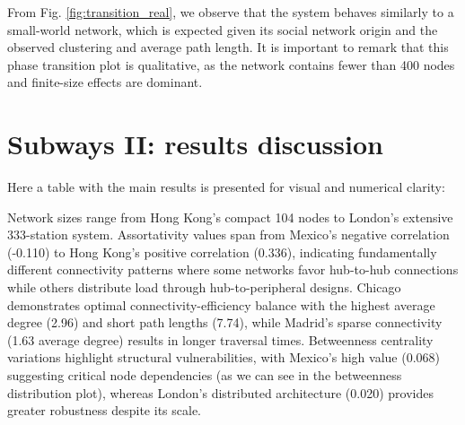 From Fig. \ref{fig:transition_real}, we observe that the system behaves similarly to a small-world network, which is expected given its social network origin and the observed clustering and average path length. It is important to remark that this phase transition plot is qualitative, as the network contains fewer than 400 nodes and finite-size effects are dominant.
\newpage
\section{Subways II: results discussion}
Here a table with the main results is presented for visual and numerical clarity:

\begin{table}[h!]
\centering
{}
\caption{Network statistics for the analyzed subway networks.}
\label{tab:network_stats}
\end{table}

Network sizes range from Hong Kong's compact 104 nodes to London's extensive 333-station system. Assortativity values span from Mexico's negative correlation (-0.110) to Hong Kong's positive correlation (0.336), indicating fundamentally different connectivity patterns where some networks favor hub-to-hub connections while others distribute load through hub-to-peripheral designs. Chicago demonstrates optimal connectivity-efficiency balance with the highest average degree (2.96) and short path lengths (7.74), while Madrid's sparse connectivity (1.63 average degree) results in longer traversal times. Betweenness centrality variations highlight structural vulnerabilities, with Mexico's high value (0.068) suggesting critical node dependencies (as we can see in the betweenness distribution plot), whereas London's distributed architecture (0.020) provides greater robustness despite its scale. 


